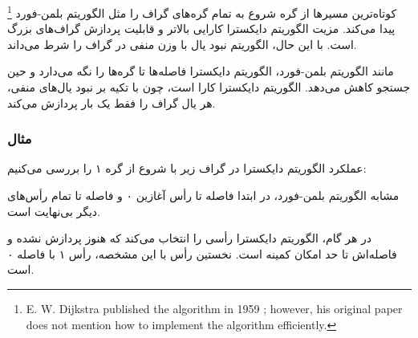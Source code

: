 
\footnote{E. W. Dijkstra published the algorithm in 1959 \cite{dij59};
however, his original paper does not mention how to implement the algorithm efficiently.}
کوتاه‌ترین مسیرها از گره شروع به تمام گره‌های گراف را مثل الگوریتم بلمن-فورد پیدا می‌کند.
مزیت الگوریتم دایکسترا کارایی بالاتر و قابلیت پردازش گراف‌های بزرگ است.
با این حال، الگوریتم نبود یال با وزن منفی در گراف را شرط می‌داند.

مانند الگوریتم بلمن-فورد، الگوریتم دایکسترا فاصله‌ها تا گره‌ها را نگه می‌دارد و حین جستجو کاهش می‌دهد.
الگوریتم دایکسترا کارا است، چون با تکیه بر نبود یال‌های منفی، هر یال گراف را فقط یک بار پردازش می‌کند.

\subsubsection{مثال}

عملکرد الگوریتم دایکسترا در گراف زیر با شروع از گره ۱ را بررسی می‌کنیم:
\begin{center}
\end{center}
مشابه الگوریتم بلمن-فورد،
در ابتدا فاصله تا رأس آغازین ۰
و فاصله تا تمام رأس‌های دیگر بی‌نهایت است.

در هر گام، الگوریتم دایکسترا رأسی را انتخاب می‌کند
که هنوز پردازش نشده و فاصله‌اش
تا حد امکان کمینه است.
نخستین رأس با این مشخصه، رأس ۱ با فاصله ۰ است.

